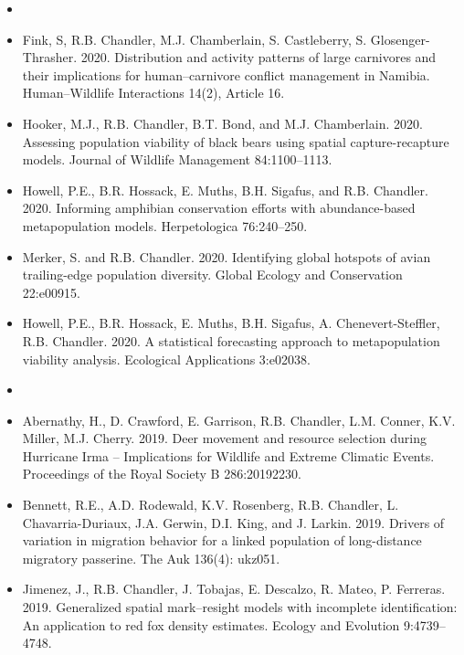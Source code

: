 \documentclass[12pt]{article}
\begin{document}
\begin{itemize}
  
\item[] { \\}

\item Fink, S, R.B. Chandler, M.J. Chamberlain, S. Castleberry,
  S. Glosenger-Thrasher. 2020. Distribution and activity patterns of 
  large carnivores and their implications for human–carnivore conflict 
  management in Namibia. Human–Wildlife Interactions 14(2), Article 16.    

\item Hooker, M.J., R.B. Chandler, B.T. Bond, and
  M.J. Chamberlain. 2020. Assessing population viability of black
  bears using spatial capture-recapture models. Journal of Wildlife
  Management 84:1100--1113.  
  
\item Howell, P.E., B.R. Hossack, E. Muths, B.H. Sigafus, and
  R.B. Chandler. 2020. Informing amphibian conservation efforts
  with abundance-based metapopulation models. Herpetologica 76:240--250. 

\item Merker, S. and R.B. Chandler. 2020. Identifying global hotspots
  of avian trailing-edge population diversity. Global Ecology and
  Conservation 22:e00915.   

\item Howell, P.E., B.R. Hossack, E. Muths, B.H. Sigafus,
  A. Chenevert-Steffler, R.B. Chandler. 2020. A statistical 
  forecasting approach to metapopulation viability
  analysis. Ecological Applications 3:e02038. 

  
\item[] { \\}

\item Abernathy, H., D. Crawford, E. Garrison, R.B. Chandler,
  L.M. Conner, K.V. Miller, M.J. Cherry. 2019. Deer movement and
  resource selection during Hurricane Irma -- Implications for
  Wildlife and Extreme Climatic Events. Proceedings of the Royal
  Society B 286:20192230. 
  
\item Bennett, R.E., A.D. Rodewald, K.V. Rosenberg, R.B. Chandler,
  L. Chavarria-Duriaux, J.A. Gerwin, D.I. King, and
  J. Larkin. 2019. Drivers of variation in migration behavior for a
  linked population of long-distance migratory passerine. The Auk
  136(4): ukz051.
  
\item Jimenez, J., R.B. Chandler, J. Tobajas, E. Descalzo, R. Mateo,
  P. Ferreras. 2019. Generalized spatial mark–resight models with
  incomplete identification: An application to red fox density
  estimates. Ecology and Evolution 9:4739--4748. 
  

\end{itemize}
\end{document}
